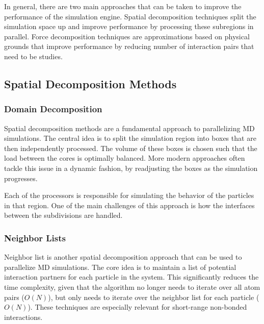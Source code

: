 \documentclass[conference]{IEEEtran}
\begin{document}
    In general, there are two main approaches that can be taken to improve the performance of the
    simulation engine. Spatial decomposition techniques split the simulation space up and improve performance by
    processing these subregions in parallel. Force decomposition techniques are approximations based on physical grounds
    that improve performance by reducing number of interaction pairs that need to be studies.

    \subsection{Spatial Decomposition Methods}

        \subsubsection{Domain Decomposition}
        Spatial decomposition methods are a fundamental approach to parallelizing MD simulations. The central idea is to 
        split the simulation region into boxes that are then independently processed. The volume of
        these boxes is chosen such that the load between the cores is optimally balanced. More modern approaches often
        tackle this issue in a dynamic fashion, by readjusting the boxes as the simulation progresses.


        Each of the processors is responsible for simulating the behavior of the particles in that region. One of the main
        challenges of this approach is how the interfaces between the subdivisions are handled. 

        \subsubsection{Neighbor Lists}
        Neighbor list is another spatial decomposition approach that can be used to parallelize MD simulations. The
        core idea is to maintain a list of potential interaction partners for each particle in the system. This
        significantly reduces the time complexity, given that the algorithm no longer needs to iterate over all
        atom pairs ($O(N)$), but only needs to iterate over the neighbor list for each particle ($O(N)$). These
        techniques are especially relevant for short-range non-bonded interactions.
\end{document}
